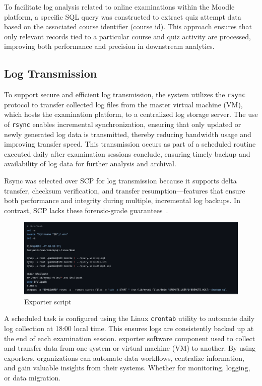 To facilitate log analysis related to online examinations within the Moodle platform, a specific SQL query was constructed to extract quiz attempt data based on the associated course identifier (course id). This approach ensures that only relevant records tied to a particular course and quiz activity are processed, improving both performance and precision in downstream analytics.
\subsection{Log Transmission}
To support secure and efficient log transmission, the system utilizes the \texttt{rsync} protocol to transfer collected log files from the master virtual machine (VM), which hosts the examination platform, to a centralized log storage server. The use of \texttt{rsync} enables incremental synchronization, ensuring that only updated or newly generated log data is transmitted, thereby reducing bandwidth usage and improving transfer speed. This transmission occurs as part of a scheduled routine executed daily after examination sessions conclude, ensuring timely backup and availability of log data for further analysis and archival.

Rsync was selected over SCP for log transmission because it supports delta transfer, checksum verification, and transfer resumption—features that ensure both performance and integrity during multiple, incremental log backups. In contrast, SCP lacks these forensic-grade guarantees~\cite{nussbaum2012performance,superuser_rsync_vs_scp,stackexchange_rsync_scp_checksum}.


\begin{figure}[H] 
	\centering
	\includegraphics[width=14cm]{figure/export-sql.png}
	\caption{Exporter script}
	\label{fig:exporter}
\end{figure}

A scheduled task is configured using the Linux \texttt{crontab} utility to automate daily log collection at 18:00 local time. This ensures logs are consistently backed up at the end of each examination session. exporter software component used to collect and transfer data from one system or virtual machine (VM) to another. By using exporters, organizations can automate data workflows, centralize information, and gain valuable insights from their systems. Whether for monitoring, logging, or data migration.

